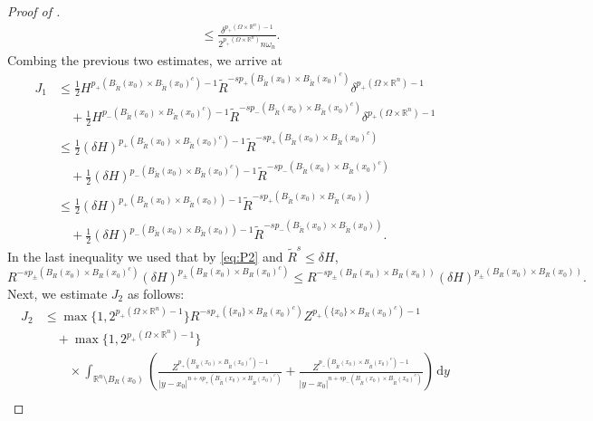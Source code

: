 \documentclass[11pt]{amsart}
\theoremstyle{plain}
\theoremstyle{definition}
\numberwithin{equation}{section}
\newcommand{\R}{\mathbb{R}}
\begin{document}
\begin{proof} [Proof of ]
\begin{align*}
& \leq \frac{\delta^{p_{+}(\Omega\times\R^n)-1}}{2^{p_{+}(\Omega\times\R^n)}n\omega_n}.
\end{align*}
Combing the previous two estimates, we arrive at 
\begin{align*}
J_1 & \leq  \frac12 H^{p_+(B_{\widetilde{R}}(x_0) \times B_{\widetilde{R}}(x_0)^c)-1} \widetilde{R}^{-sp_+(B_{\widetilde{R}}(x_0) \times B_{\widetilde{R}}(x_0)^c)} \delta^{p_{+}(\Omega\times\R^n)-1} \\
& \quad +\frac12 H^{p_-(B_{\widetilde{R}}(x_0) \times B_{\widetilde{R}}(x_0)^c)-1} \widetilde{R}^{-sp_-(B_{\widetilde{R}}(x_0) \times B_{\widetilde{R}}(x_0)^c)}\delta^{p_{+}(\Omega\times\R^n)-1} \\
& \leq \frac12 (\delta H)^{p_+(B_{\widetilde{R}}(x_0) \times B_{\widetilde{R}}(x_0)^c)-1} \widetilde{R}^{-sp_+(B_{\widetilde{R}}(x_0) \times B_{\widetilde{R}}(x_0)^c)}  \\
& \quad +\frac12 (\delta H)^{p_-(B_{\widetilde{R}}(x_0) \times B_{\widetilde{R}}(x_0)^c)-1} \widetilde{R}^{-sp_-(B_{\widetilde{R}}(x_0) \times B_{\widetilde{R}}(x_0)^c)} \\
& \leq \frac12 (\delta H)^{p_+(B_{\widetilde{R}}(x_0) \times B_{\widetilde{R}}(x_0))-1} \widetilde{R}^{-sp_+(B_{\widetilde{R}}(x_0) \times B_{\widetilde{R}}(x_0))}  \\
& \quad +\frac12 (\delta H)^{p_-(B_{\widetilde{R}}(x_0) \times B_{\widetilde{R}}(x_0))-1} \widetilde{R}^{-sp_-(B_{\widetilde{R}}(x_0) \times B_{\widetilde{R}}(x_0))}.
\end{align*}
In the last inequality we used that by \eqref{eq:P2} and $\widetilde{R}^s\leq \delta H$,
\[  R^{-s p_{\pm}(B_R(x_0)\times B_R(x_0)^c)} (\delta H)^{p_{\pm}(B_R(x_0)\times B_R(x_0)^c)}   \leq R^{-s p_{\pm}(B_R(x_0)\times B_R(x_0))} (\delta H)^{p_{\pm}(B_R(x_0)\times B_R(x_0))}. \]
Next, we estimate $J_2$ as follows:
\begin{equation}\label{eq:estJ2}
\begin{aligned}
J_2 &\leq \max\{1,2^{p_+(\Omega\times\R^n)-1}\} R^{-sp_{+}(\{x_0\}\times B_R(x_0)^c)}Z^{p_{+}(\{x_0\}\times B_R(x_0)^c)-1} \\
&\quad + \max\{1,2^{p_+(\Omega\times\R^n)-1}\}  \\
&\qquad \times \int_{\mathbb{R}^n \setminus B_{R}(x_0)} \left(\frac{Z^{p_{+}(B_{\widetilde{R}}(x_0)\times B_{\widetilde{R}}(x_0)^c)-1}}{|y-x_0|^{n+sp_{+}(B_{\widetilde{R}}(x_0)\times B_{\widetilde{R}}(x_0)^c)}}  + \frac{Z^{p_{-}(B_{\widetilde{R}}(x_0)\times B_{\widetilde{R}}(x_0)^c)-1}}{|y-x_0|^{n+sp_{-}(B_{\widetilde{R}}(x_0)\times B_{\widetilde{R}}(x_0)^c)}} \right)\,\mathrm{d}y \\

\end{aligned}
\end{equation}
\end{proof}
\end{document}

